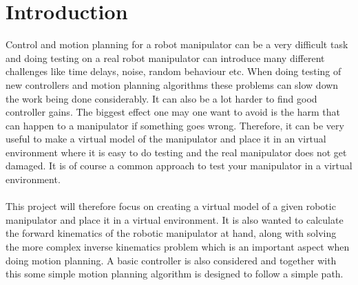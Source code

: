 \chapter{Introduction}

Control and motion planning for a robot manipulator can be a very difficult task and doing testing on a real robot manipulator can introduce many different challenges like time delays, noise, random behaviour etc. When doing testing of new controllers and motion planning algorithms these problems can slow down the work being done considerably. It can also be a lot harder to find good controller gains. The biggest effect one may one want to avoid is the harm that can happen to a manipulator if something goes wrong. Therefore, it can be very useful to make a virtual model of the manipulator and place it in an virtual environment where it is easy to do testing and the real manipulator does not get damaged. It is of course a common approach to test your manipulator in a virtual environment.\\\\
This project will therefore focus on creating a virtual model of a given robotic manipulator and place it in a virtual environment. It is also wanted to calculate the forward kinematics of the robotic manipulator at hand, along with solving the more complex inverse kinematics problem which is an important aspect when doing motion planning. A basic controller is also considered and together with this some simple motion planning algorithm is designed to follow a simple path. \\\\
    





